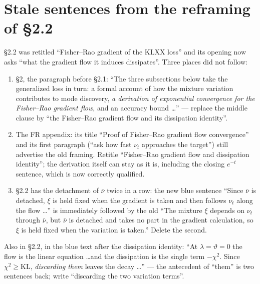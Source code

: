 \documentclass[11pt]{article}
\newcommand{\KL}{\mathrm{KL}}
\newcommand{\Ge}{\geqslant}
\begin{document}
\section{Stale sentences from the reframing of \S2.2}
\label{sec:stale}

\S2.2 was retitled ``Fisher--Rao gradient of the KLXX loss'' and its opening
now asks ``what the gradient flow it induces dissipates''. Three places did not
follow:

\begin{enumerate}[leftmargin=*,itemsep=2pt]
\item \S2, the paragraph before \S2.1: ``The three subsections below take the
      generalized loss in turn: a formal account of how the mixture variation
      contributes to mode discovery, \emph{a derivation of exponential
      convergence for the Fisher--Rao gradient flow}, and an accuracy bound
      \dots'' --- replace the middle clause by ``the Fisher--Rao gradient flow
      and its dissipation identity''.
\item The FR appendix: its title ``Proof of Fisher--Rao gradient flow
      convergence'' and its first paragraph (``ask how fast $\nu_t$ approaches
      the target'') still advertise the old framing. Retitle ``Fisher--Rao
      gradient flow and dissipation identity''; the derivation itself can stay
      as it is, including the closing $e^{-t}$ sentence, which is now
      correctly qualified.
\item \S2.2 has the detachment of $\bar\nu$ twice in a row: the new blue
      sentence ``Since $\bar\nu$ is detached, $\xi$ is held fixed when the
      gradient is taken and then follows $\nu_t$ along the flow \dots'' is
      immediately followed by the old ``The mixture $\xi$ depends on $\nu_t$
      through $\bar\nu$, but $\bar\nu$ is detached and takes no part in the
      gradient calculation, so $\xi$ is held fixed when the variation is
      taken.'' Delete the second.
\end{enumerate}

\noindent
Also in \S2.2, in the blue text after the dissipation identity: ``At
$\lambda=\vartheta=0$ the flow is the linear equation \dots and the dissipation
is the single term $-\chi^2$. Since $\chi^2\Ge\KL$, \emph{discarding them}
leaves the decay \dots'' --- the antecedent of ``them'' is two sentences back;
write ``discarding the two variation terms''.

\end{document}
